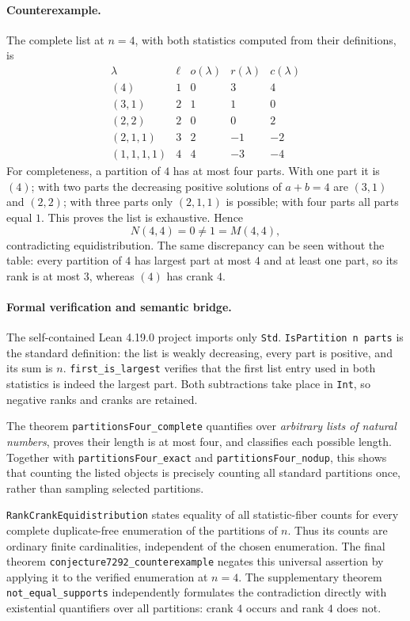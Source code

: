 \documentclass[11pt]{article}
\begin{document}
\paragraph{Counterexample.}
The complete list at $n=4$, with both statistics computed from their
definitions, is
\[
\begin{array}{c|r|r|r|r}
 \lambda & \ell & o(\lambda) & r(\lambda) & c(\lambda)\\\hline
 (4)       &1&0& 3& 4\\
 (3,1)     &2&1& 1& 0\\
 (2,2)     &2&0& 0& 2\\
 (2,1,1)   &3&2&-1&-2\\
 (1,1,1,1) &4&4&-3&-4
\end{array}
\]
For completeness, a partition of $4$ has at most four parts. With one
part it is $(4)$; with two parts the decreasing positive solutions of
$a+b=4$ are $(3,1)$ and $(2,2)$; with three parts only $(2,1,1)$ is
possible; with four parts all parts equal $1$. This proves the list is
exhaustive. Hence
\[
 N(4,4)=0\ne1=M(4,4),
\]
contradicting equidistribution. The same discrepancy can be seen without
the table: every partition of $4$ has largest part at most $4$ and at
least one part, so its rank is at most $3$, whereas $(4)$ has crank $4$.

\paragraph{Formal verification and semantic bridge.}
The self-contained Lean 4.19.0 project imports only \texttt{Std}.
\texttt{IsPartition n parts} is the standard definition: the list is
weakly decreasing, every part is positive, and its sum is $n$.
\texttt{first\_is\_largest} verifies that the first list entry used in
both statistics is indeed the largest part. Both subtractions take place
in \texttt{Int}, so negative ranks and cranks are retained.

The theorem \texttt{partitionsFour\_complete} quantifies over
\emph{arbitrary lists of natural numbers}, proves their length is at most
four, and classifies each possible length. Together with
\texttt{partitionsFour\_exact} and \texttt{partitionsFour\_nodup}, this
shows that counting the listed objects is precisely counting all standard
partitions once, rather than sampling selected partitions.

\texttt{RankCrankEquidistribution} states equality of all statistic-fiber
counts for every complete duplicate-free enumeration of the partitions
of $n$. Thus its counts are ordinary finite cardinalities, independent of
the chosen enumeration. The final theorem
\texttt{conjecture7292\_counterexample} negates this universal assertion
by applying it to the verified enumeration at $n=4$. The supplementary
theorem \texttt{not\_equal\_supports} independently formulates the
contradiction directly with existential quantifiers over all partitions:
crank $4$ occurs and rank $4$ does not.
\end{document}
